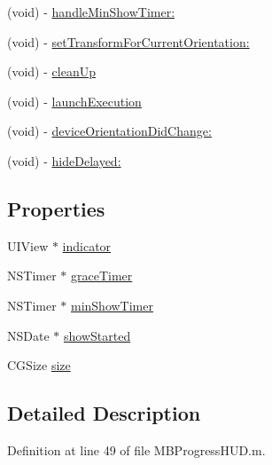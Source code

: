\begin{DoxyCompactItemize}
(void) -\/ \hyperlink{category_m_b_progress_h_u_d_07_08_ac821792e52ccf50a0f706e8d5df4e385}{handle\+Min\+Show\+Timer\+:}
\item 
(void) -\/ \hyperlink{category_m_b_progress_h_u_d_07_08_afeb3056f684d58ef12ef0a62d05d6f56}{set\+Transform\+For\+Current\+Orientation\+:}
\item 
(void) -\/ \hyperlink{category_m_b_progress_h_u_d_07_08_ad37178e8a931dd238e164cc1e13042fa}{clean\+Up}
\item 
(void) -\/ \hyperlink{category_m_b_progress_h_u_d_07_08_a101d93f06bd73aa0cb365842cfc8966d}{launch\+Execution}
\item 
(void) -\/ \hyperlink{category_m_b_progress_h_u_d_07_08_a75105f00fb727353b35fa6d2cf320114}{device\+Orientation\+Did\+Change\+:}
\item 
(void) -\/ \hyperlink{category_m_b_progress_h_u_d_07_08_afa9de8a535c05efd09ab379039557536}{hide\+Delayed\+:}
\end{DoxyCompactItemize}
\subsection*{Properties}
\begin{DoxyCompactItemize}
\item 
U\+I\+View $\ast$ \hyperlink{category_m_b_progress_h_u_d_07_08_a88f0841ae8c0e93249afc68954859072}{indicator}
\item 
N\+S\+Timer $\ast$ \hyperlink{category_m_b_progress_h_u_d_07_08_a856da5d6ea8f970c9f79cd43f8f4e3d7}{grace\+Timer}
\item 
N\+S\+Timer $\ast$ \hyperlink{category_m_b_progress_h_u_d_07_08_ae0ef7ca861bf900eaed11b57ad49eddc}{min\+Show\+Timer}
\item 
N\+S\+Date $\ast$ \hyperlink{category_m_b_progress_h_u_d_07_08_a45366644943d7cd700062c755ceef991}{show\+Started}
\item 
C\+G\+Size \hyperlink{category_m_b_progress_h_u_d_07_08_aa7e6a57f64a0347bf480dc63ca6d2d35}{size}
\end{DoxyCompactItemize}


\subsection{Detailed Description}


Definition at line 49 of file M\+B\+Progress\+H\+U\+D.\+m.



